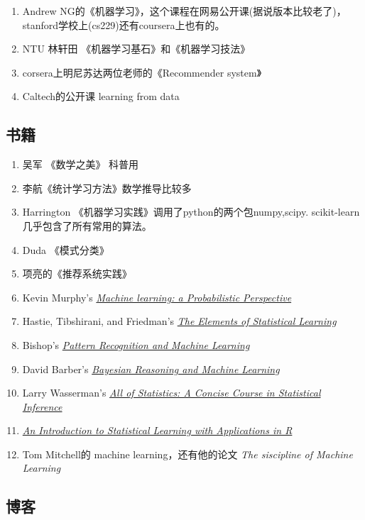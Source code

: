 \documentclass[10pt,a4paper,UTF8]{article}
\begin{document}
\begin{enumerate}
\item Andrew NG的《机器学习》，这个课程在网易公开课(据说版本比较老了)，stanford学校上(cs229)还有coursera上也有的。
\item NTU 林轩田 《机器学习基石》和《机器学习技法》
\item corsera上明尼苏达两位老师的《Recommender system》
\item Caltech的公开课 learning from data
\end{enumerate}

\subsection{书籍}
\label{sec:org217f187}


\begin{enumerate}
\item 吴军 《数学之美》 科普用
\item 李航《统计学习方法》数学推导比较多
\item Harrington 《机器学习实践》调用了python的两个包numpy,scipy. scikit-learn几乎包含了所有常用的算法。
\item Duda 《模式分类》
\item 项亮的《推荐系统实践》
\item Kevin Murphy's \emph{\href{http://www.cs.ubc.ca/\~murphyk/MLbook/}{Machine learning: a Probabilistic Perspective}}
\item Hastie, Tibshirani, and Friedman's \emph{\href{http://statweb.stanford.edu/\~tibs/ElemStatLearn/}{The Elements of Statistical Learning}}
\item Bishop's \emph{\href{http://research.microsoft.com/en-us/um/people/cmbishop/prml/}{Pattern Recognition and Machine Learning}}
\item David Barber's \emph{\href{http://web4.cs.ucl.ac.uk/staff/D.Barber/pmwiki/pmwiki.php?n=Brml.HomePage}{Bayesian Reasoning and Machine Learning}}
\item Larry Wasserman's \emph{\href{http://www.amazon.com/All-Statistics-Statistical-Inference-Springer/dp/0387402721}{All of Statistics: A Concise Course in Statistical Inference}}
\item \emph{\href{http://www-bcf.usc.edu/\~gareth/ISL/}{An Introduction to Statistical Learning with Applications in R}}
\item Tom Mitchell的 machine learning，还有他的论文 \emph{The siscipline of Machine Learning}
\end{enumerate}
\subsection{博客}
\label{sec:org4ad0fea}
\end{document}
